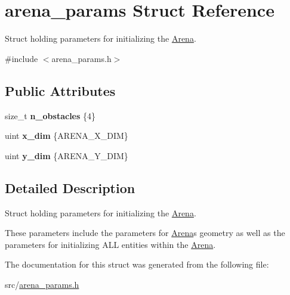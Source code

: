 \hypertarget{structarena__params}{}\section{arena\+\_\+params Struct Reference}
\label{structarena__params}


Struct holding parameters for initializing the \hyperlink{classArena}{Arena}.  




{\ttfamily \#include $<$arena\+\_\+params.\+h$>$}

\subsection*{Public Attributes}
\begin{DoxyCompactItemize}
\item 
size\+\_\+t {\bfseries n\+\_\+obstacles} \{4\}\hypertarget{structarena__params_a41015e200424ec7ef1f86eaf0ce99dd0}{}\label{structarena__params_a41015e200424ec7ef1f86eaf0ce99dd0}

\item 
uint {\bfseries x\+\_\+dim} \{A\+R\+E\+N\+A\+\_\+\+X\+\_\+\+D\+IM\}\hypertarget{structarena__params_afa86b434ed8ea5a4fe9ae14ae1438e8f}{}\label{structarena__params_afa86b434ed8ea5a4fe9ae14ae1438e8f}

\item 
uint {\bfseries y\+\_\+dim} \{A\+R\+E\+N\+A\+\_\+\+Y\+\_\+\+D\+IM\}\hypertarget{structarena__params_ab5d50b9affa9c753c15e1d6f088824af}{}\label{structarena__params_ab5d50b9affa9c753c15e1d6f088824af}

\end{DoxyCompactItemize}


\subsection{Detailed Description}
Struct holding parameters for initializing the \hyperlink{classArena}{Arena}. 

These parameters include the parameters for \hyperlink{classArena}{Arena}\textquotesingle{}s geometry as well as the parameters for initializing A\+LL entities within the \hyperlink{classArena}{Arena}. 

The documentation for this struct was generated from the following file\+:\begin{DoxyCompactItemize}
\item 
src/\hyperlink{arena__params_8h}{arena\+\_\+params.\+h}\end{DoxyCompactItemize}

